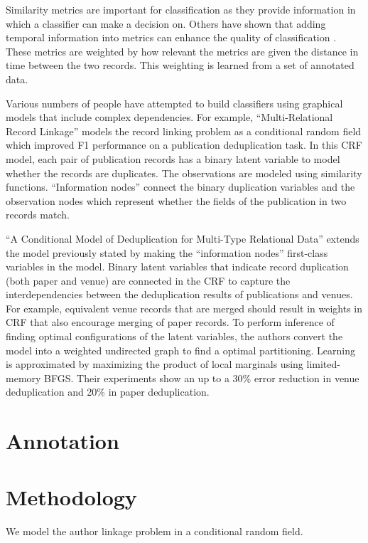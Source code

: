 \documentclass[twocolumn,letterpaper]{article}
\begin{document}
Similarity metrics are important for classification as they provide information in which a classifier can make a decision on. Others have shown that adding temporal information into metrics can enhance the quality of classification \cite{DBLP:journals/fcsc/LiDMS12}. These metrics are weighted by how relevant the metrics are given the distance in time between the two records. This weighting is learned from a set of annotated data.

Various numbers of people have attempted to build classifiers using graphical models that include complex dependencies. For example, ``Multi-Relational Record Linkage'' \cite{Domingos04multi} models the record linking problem as a conditional random field which improved F1 performance on a publication deduplication task. In this CRF model, each pair of publication records has a binary latent variable to model whether the records are duplicates.  The observations are modeled using similarity functions.  ``Information nodes'' connect the binary duplication variables and the observation nodes which represent whether the fields of the publication in two records match.

``A Conditional Model of Deduplication for Multi-Type Relational Data'' \cite{Culotta05aconditional} extends the model previously stated by making the ``information nodes'' first-class variables in the model.  Binary latent variables that indicate record duplication (both paper and venue) are connected in the CRF to capture the interdependencies between the deduplication results of publications and venues.  For example, equivalent venue records that are merged should result in weights in CRF that also encourage merging of paper records.  To perform inference of finding optimal configurations of the latent variables, the authors convert the model into a weighted undirected graph to find a optimal partitioning.  Learning is approximated by maximizing the product of local marginals using limited-memory BFGS.  Their experiments show an up to a 30\% error reduction in venue deduplication and 20\% in paper deduplication.

\section{Annotation} %
\label{sec:annotation}


\section{Methodology} %
\label{sec:methodology}
We model the author linkage problem in a conditional random field.
\end{document}
